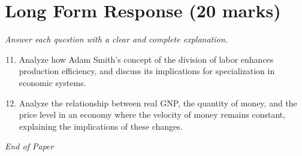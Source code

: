 \documentclass[12pt]{article}
\begin{document}
\section*{Long Form Response (20 marks)}
\textit{Answer each question with a clear and complete explanation.}
\begin{enumerate}[label=\arabic*.]
\setcounter{enumi}{10}
\item Analyze how Adam Smith's concept of the division of labor enhances production efficiency, and discuss its implications for specialization in economic systems.
\item Analyze the relationship between real GNP, the quantity of money, and the price level in an economy where the velocity of money remains constant, explaining the implications of these changes.
\end{enumerate}

\vfill
\noindent\textit{End of Paper}
\end{document}
